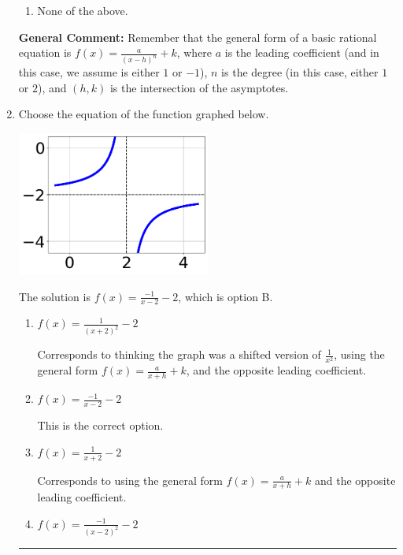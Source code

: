 \documentclass{extbook}[14pt]
\newcommand{\litem}[1]{\item #1

\rule{\textwidth}{0.4pt}}
\begin{document}
\begin{enumerate}
{\begin{enumerate}[label=\Alph*.]
\item None of the above.\end{enumerate}
\textbf{General Comment:} Remember that the general form of a basic rational equation is $ f(x) = \frac{a}{(x-h)^n} + k$, where $a$ is the leading coefficient (and in this case, we assume is either $1$ or $-1$), $n$ is the degree (in this case, either $1$ or $2$), and $(h, k)$ is the intersection of the asymptotes.
}
\litem{
Choose the equation of the function graphed below.

\begin{center}
    \includegraphics[width=0.5\textwidth]{../Figures/rationalGraphToEquationCopyA.png}
\end{center}


The solution is \( f(x) = \frac{-1}{x - 2} - 2 \), which is option B.\begin{enumerate}[label=\Alph*.]
\item \( f(x) = \frac{1}{(x + 2)^2} - 2 \)

Corresponds to thinking the graph was a shifted version of $\frac{1}{x^2}$, using the general form $f(x) = \frac{a}{x+h}+k$, and the opposite leading coefficient.
\item \( f(x) = \frac{-1}{x - 2} - 2 \)

This is the correct option.
\item \( f(x) = \frac{1}{x + 2} - 2 \)

Corresponds to using the general form $f(x) = \frac{a}{x+h}+k$ and the opposite leading coefficient.
\item \( f(x) = \frac{-1}{(x - 2)^2} - 2 \)


\end{enumerate}}
\end{enumerate}
\end{document}
